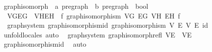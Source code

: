 \begin{isabellebody}
%
\endisatagproof
{\isafoldproof}%
%
\isadelimproof
%
\endisadelimproof
\isanewline
\isanewline
{}\isamarkupfalse%
\isanewline
\isanewline
{}\isamarkupfalse%
\ graph{\isacharunderscore}{\kern0pt}isomorph\ {\isacharcolon}{\kern0pt}{\isacharcolon}{\kern0pt}\ {\isachardoublequoteopen}{\isacharprime}{\kern0pt}a\ pregraph\ {\isasymRightarrow}\ {\isacharprime}{\kern0pt}b\ pregraph\ {\isasymRightarrow}\ bool{\isachardoublequoteclose}\ {\isacharparenleft}{\kern0pt}\ {\isachardoublequoteopen}{\isasymsimeq}{\isachardoublequoteclose}\ {}{}{\isacharparenright}{\kern0pt}\ \isanewline
\ \ {\isachardoublequoteopen}{\isacharparenleft}{\kern0pt}V\isactrlsub G{\isacharcomma}{\kern0pt}E\isactrlsub G{\isacharparenright}{\kern0pt}\ {\isasymsimeq}\ {\isacharparenleft}{\kern0pt}V\isactrlsub H{\isacharcomma}{\kern0pt}E\isactrlsub H{\isacharparenright}{\kern0pt}\ {\isasymlongleftrightarrow}\ {\isacharparenleft}{\kern0pt}{\isasymexists}f{\isachardot}{\kern0pt}\ graph{\isacharunderscore}{\kern0pt}isomorphism\ V\isactrlsub G\ E\isactrlsub G\ V\isactrlsub H\ E\isactrlsub H\ f{\isacharparenright}{\kern0pt}{\isachardoublequoteclose}\isanewline
\isanewline
{}\isamarkupfalse%
\ {\isacharparenleft}{\kern0pt}\ graph{\isacharunderscore}{\kern0pt}system{\isacharparenright}{\kern0pt}\ graph{\isacharunderscore}{\kern0pt}isomorphism{\isacharunderscore}{\kern0pt}id{\isacharcolon}{\kern0pt}\ {\isachardoublequoteopen}graph{\isacharunderscore}{\kern0pt}isomorphism\ V\ E\ V\ E\ id{\isachardoublequoteclose}\isanewline
%
\isadelimproof
\ \ %
\endisadelimproof
%
\isatagproof
{}\isamarkupfalse%
\ unfold{\isacharunderscore}{\kern0pt}locales\ auto%
\endisatagproof
{\isafoldproof}%
%
\isadelimproof
\isanewline
%
\endisadelimproof
\isanewline
{}\isamarkupfalse%
\ {\isacharparenleft}{\kern0pt}\ graph{\isacharunderscore}{\kern0pt}system{\isacharparenright}{\kern0pt}\ graph{\isacharunderscore}{\kern0pt}isomorph{\isacharunderscore}{\kern0pt}refl{\isacharcolon}{\kern0pt}\ {\isachardoublequoteopen}{\isacharparenleft}{\kern0pt}V{\isacharcomma}{\kern0pt}E{\isacharparenright}{\kern0pt}\ {\isasymsimeq}\ {\isacharparenleft}{\kern0pt}V{\isacharcomma}{\kern0pt}E{\isacharparenright}{\kern0pt}{\isachardoublequoteclose}\isanewline
%
\isadelimproof
\ \ %
\endisadelimproof
%
\isatagproof
{}\isamarkupfalse%
\ graph{\isacharunderscore}{\kern0pt}isomorphism{\isacharunderscore}{\kern0pt}id\ \isamarkupfalse%
\ auto%
\endisatagproof
{\isafoldproof}%

\end{isabellebody}
